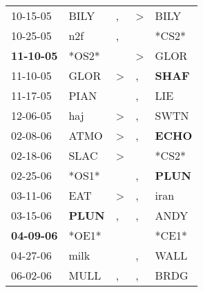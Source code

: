 \begin{supertabular}{p{0.07\textwidth}p{0.06\textwidth}p{0.02\textwidth}p{0.02\textwidth}p{0.06\textwidth}}
          10-15-05\textsuperscript{} &           BILY\textsuperscript{} &                , &     \textgreater &           BILY\textsuperscript{} \\
          10-25-05\textsuperscript{} &            n2f\textsuperscript{} &                , &                  &                            *CS2* \\
 \textbf{11-10-05\textsuperscript{}} &                            *OS2* &                  &     \textgreater &           GLOR\textsuperscript{} \\
          11-10-05\textsuperscript{} &           GLOR\textsuperscript{} &     \textgreater &                , &  \textbf{SHAF\textsuperscript{}} \\
          11-17-05\textsuperscript{} &           PIAN\textsuperscript{} &                  &                , &            LIE\textsuperscript{} \\
          12-06-05\textsuperscript{} &            haj\textsuperscript{} &     \textgreater &                , &           SWTN\textsuperscript{} \\
          02-08-06\textsuperscript{} &           ATMO\textsuperscript{} &     \textgreater &                , &  \textbf{ECHO\textsuperscript{}} \\
          02-18-06\textsuperscript{} &           SLAC\textsuperscript{} &     \textgreater &                  &                            *CS2* \\
          02-25-06\textsuperscript{} &                            *OS1* &                  &                , &  \textbf{PLUN\textsuperscript{}} \\
          03-11-06\textsuperscript{} &            EAT\textsuperscript{} &     \textgreater &                , &           iran\textsuperscript{} \\
          03-15-06\textsuperscript{} &  \textbf{PLUN\textsuperscript{}} &                , &                , &           ANDY\textsuperscript{} \\
 \textbf{04-09-06\textsuperscript{}} &                            *OE1* &                  &                  &                            *CE1* \\
          04-27-06\textsuperscript{} &           milk\textsuperscript{} &                  &                , &           WALL\textsuperscript{} \\
          06-02-06\textsuperscript{} &           MULL\textsuperscript{} &                , &                , &           BRDG\textsuperscript{} \\

\end{supertabular}
